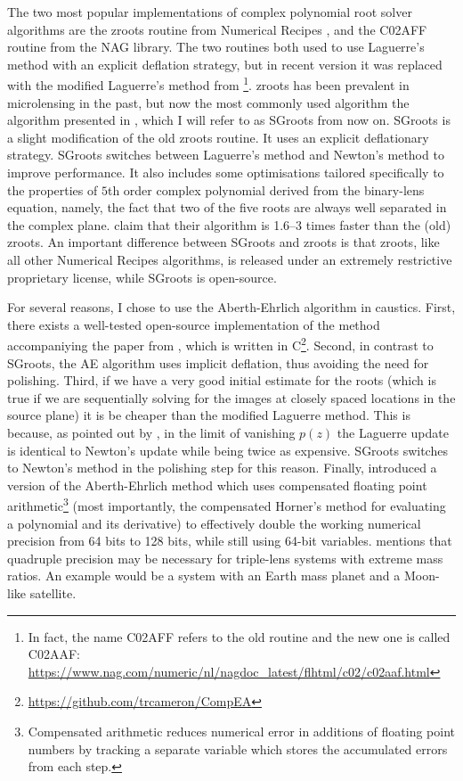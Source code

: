 \documentclass[12pt,dvipsnames]{report}
\newcommand{\ssf}[1]{\textsf{#1}}
\begin{document}
The two most popular implementations of complex polynomial root solver algorithms are
the \ssf{zroots} routine from Numerical Recipes \citep{1992nrca.book.....P}, and the
\ssf{C02AFF} routine from the NAG library. The two routines both used to use
Laguerre's method with an explicit deflation strategy, but in recent version it 
was replaced with the modified Laguerre's method from 
\citet{cameron2019}\footnote{In fact, the name
    \ssf{C02AFF} refers to the old routine and the new one is called \ssf{C02AAF}:
    \url{https://www.nag.com/numeric/nl/nagdoc_latest/flhtml/c02/c02aaf.html}}. 
   \ssf{zroots}  has been prevalent in microlensing in the past, but now the most commonly
used algorithm the algorithm presented in \citet{2012arXiv1203.1034S},
which I will refer to as \ssf{SGroots} from now on. \ssf{SGroots} is a slight
modification of the old \ssf{zroots} routine. It uses an explicit deflationary
strategy. \ssf{SGroots} switches between Laguerre's method and Newton's method to improve
performance. It also includes some optimisations tailored specifically to the
properties of $5$th order complex polynomial derived from the binary-lens equation, 
namely, the fact that two of the five roots are always well separated in the complex plane. 
\citet{2012arXiv1203.1034S} claim that their algorithm is
1.6--3 times faster than the (old) \ssf{zroots}. An  important difference between 
\ssf{SGroots} and \ssf{zroots} is that \ssf{zroots}, like all other Numerical Recipes 
algorithms, is released under an extremely restrictive proprietary license, while 
\ssf{SGroots} is open-source.

For several reasons,  I chose to use the Aberth-Ehrlich algorithm in \ssf{caustics}.
First, there exists a well-tested open-source implementation of the method 
accompaniying the paper from \citet{cameron2021}, which is written 
in \ssf{C}\footnote{\url{https://github.com/trcameron/CompEA}}. 
Second, in contrast to \ssf{SGroots}, the AE algorithm uses implicit deflation, thus avoiding the 
need for polishing. Third, if we have a very good initial 
estimate for the roots (which is true if we are sequentially solving for the images at closely spaced 
locations in the source plane) it is be cheaper than the  modified Laguerre method.
This is because, 
as pointed out by \citet{2012arXiv1203.1034S}, in the limit of vanishing $p(z)$ the 
Laguerre update is identical to Newton's update while being twice as expensive.
\ssf{SGroots} switches to Newton's method in the polishing step for this reason. Finally,
\citet{cameron2021} introduced a version of the Aberth-Ehrlich method which uses
compensated floating point arithmetic\footnote{Compensated arithmetic reduces  numerical
error in additions of floating point numbers by tracking a separate variable which 
stores the accumulated errors from each step.} (most importantly, the compensated Horner's method 
for evaluating a polynomial and its derivative) to effectively double the 
working numerical precision from 64 bits to 128 bits, while still using 64-bit variables.
\citet{2010ApJ...716.1408B} mentions that quadruple precision may be necessary
for triple-lens systems with extreme mass ratios. An example would be a system with an Earth
mass planet and a Moon-like satellite.
\end{document}
